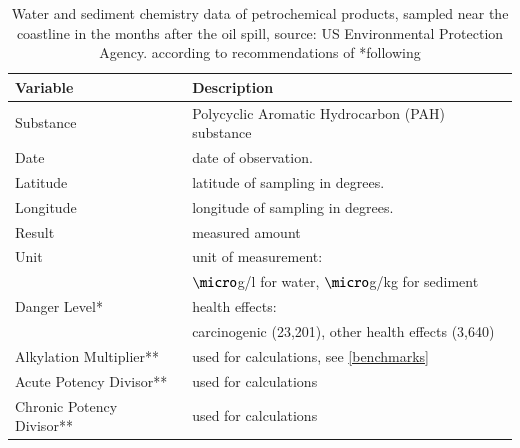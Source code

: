 \documentclass[authoryear,12pt]{elsarticle}
\begin{document}
\begin{table}
\begin{tabular}{lp{9.5cm}}\hline
\bf Variable & \bf Description \\\hline
Substance & Polycyclic Aromatic Hydrocarbon (PAH) substance \\
Date & date of observation.\\
Latitude & latitude   {of sampling} in degrees. \\
Longitude & longitude   {of sampling} in degrees. \\
Result &  measured amount \\
Unit &  unit of measurement: \\
& { \small ${\micro}$g/l for water, ${\micro}$g/kg for sediment} \\
Danger Level* &  health effects:\\
& {\small carcinogenic ({23,201}), other health effects ({3,640})} \\
Alkylation Multiplier** & used for calculations, see \ref{benchmarks} \\
Acute Potency Divisor** & used for calculations\\
Chronic Potency Divisor** & used for calculations \\\hline
\end{tabular}
\label{table.chemicals}
\caption{Water and sediment chemistry data of petrochemical products, sampled near the coastline in the months after the oil spill, source: US Environmental  Protection Agency.\newline
{\small *according to recommendations of \citet{pah-danger}}\newline
{\small **following \citet{pah-benchmark}} }
\end{table}
\end{document}
